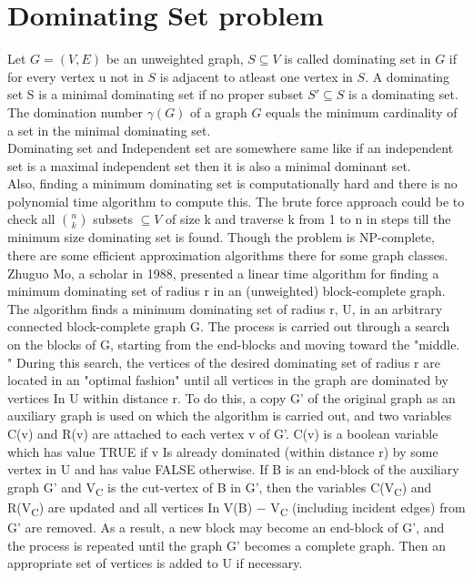 \documentclass{memoir}
\begin{document}
\section*{Dominating Set problem}
Let $G=(V,E)$ be an unweighted graph, $S \subseteq V$ is called dominating set in $G$ if for every vertex u not in $S$ is adjacent to atleast one vertex in $S$. A dominating set S is a minimal dominating set if no proper subset $S' \subseteq S$ is a dominating set. The domination number \begin{math} \gamma (G) \end{math} of a graph $G$ equals the minimum cardinality of a set in the minimal dominating set.\\

Dominating set and Independent set are somewhere same like if an independent set is a maximal independent set then it is also a minimal dominant set.\\

Also, finding a minimum dominating set is computationally hard and there is no polynomial time algorithm to compute this. The brute force approach could be to check all $n \choose k$ subsets $\subseteq V$ of size k and traverse k from 1 to n in steps till the minimum size dominating set is found. Though the problem is NP-complete, there are some efficient approximation algorithms there for some graph classes.\\

Zhuguo Mo, a scholar in 1988, presented a linear time algorithm for finding a minimum dominating set of radius r in an (unweighted) block-complete graph. The algorithm finds a minimum dominating set of radius r, U, in an arbitrary connected block-complete graph G. The process is carried out through a search on the blocks of G, starting from the end-blocks and moving toward the "middle. " During this search, the vertices of the
desired dominating set of radius r are located in an "optimal fashion" until
all vertices in the graph are dominated by vertices In U within
distance r. To do this, a copy G' of the original graph as an auxiliary graph is used on which the algorithm is carried out, and two variables C(v) and R(v)  are attached to each vertex v of G'. C(v) is a boolean variable which has value TRUE if v Is already dominated (within distance r) by some vertex in U and has value FALSE otherwise. If B is an end-block of the auxiliary graph G' and V\textsubscript{C} is the cut-vertex of B in G', then the variables C(V\textsubscript{C}) and R(V\textsubscript{C}) are updated and all
vertices In V(B) $-$ V\textsubscript{C} (including incident edges) from G' are removed. As a result, a new block may become an end-block of G', and the process is repeated until the graph G' becomes a complete graph. Then an
appropriate set of vertices is added to U if necessary.
\end{document}
